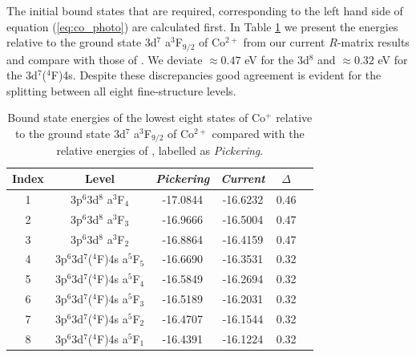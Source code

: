 The initial bound states that are required, corresponding to the left hand side of equation (\ref{eq:co_photo}) are calculated first. In Table \ref{tab:co_blevels} we present the energies relative to the ground state 3d$^7$ a$^3$F$_{9/2}$ of Co$^{2+}$ from our current $R$-matrix results and compare with those of \citet{1998ApJS..117..261P}. We deviate $\approx 0.47$ eV for the 3d$^8$ and $\approx 0.32$ eV for the 3d$^7$($^4$F)4s. Despite these discrepancies
good agreement is evident for the splitting between all eight fine-structure levels.

%
\begin{table}[hbt!]
\footnotesize
\begin{center}
\begin{tabular}{@{} l *5c @{}}
 \hline
\multicolumn{1}{c}{Index} & Level & \textit{Pickering} & \textit{Current} & $\Delta$ \\

 \hline
\multicolumn{1}{c}{  1} & 3p$^6$3d$^8$ a$^3$F$_{ 4}$ & -17.0844 & -16.6232 & 0.46 \\
\multicolumn{1}{c}{  2} & 3p$^6$3d$^8$ a$^3$F$_{ 3}$ & -16.9666 & -16.5004 & 0.47\\
\multicolumn{1}{c}{  3} & 3p$^6$3d$^8$ a$^3$F$_{ 2}$ & -16.8864  & -16.4159 & 0.47\\
\multicolumn{1}{c}{  4} & 3p$^6$3d$^7$($^4$F)4s a$^5$F$_{ 5}$ & -16.6690 & -16.3531 & 0.32 \\
\multicolumn{1}{c}{  5} & 3p$^6$3d$^7$($^4$F)4s a$^5$F$_{ 4}$ & -16.5849 & -16.2694 & 0.32\\
\multicolumn{1}{c}{  6} & 3p$^6$3d$^7$($^4$F)4s a$^5$F$_{ 3}$ & -16.5189 & -16.2031 & 0.32\\
\multicolumn{1}{c}{  7} & 3p$^6$3d$^7$($^4$F)4s a$^5$F$_{ 2}$ & -16.4707 & -16.1544 & 0.32\\
\multicolumn{1}{c}{  8} & 3p$^6$3d$^7$($^4$F)4s a$^5$F$_{ 1}$ & -16.4391 & -16.1224 & 0.32\\
 \hline
 \end{tabular}
 \caption{Bound state energies of the lowest eight states of Co$^{+}$ relative to the ground state 3d$^7$ a$^3$F$_{9/2}$ of Co$^{2+}$ compared with the relative energies of \citet{1998ApJS..117..261P}, labelled as \textit{Pickering}. \label{tab:co_blevels}}
 \end{center}
\end{table}
%


